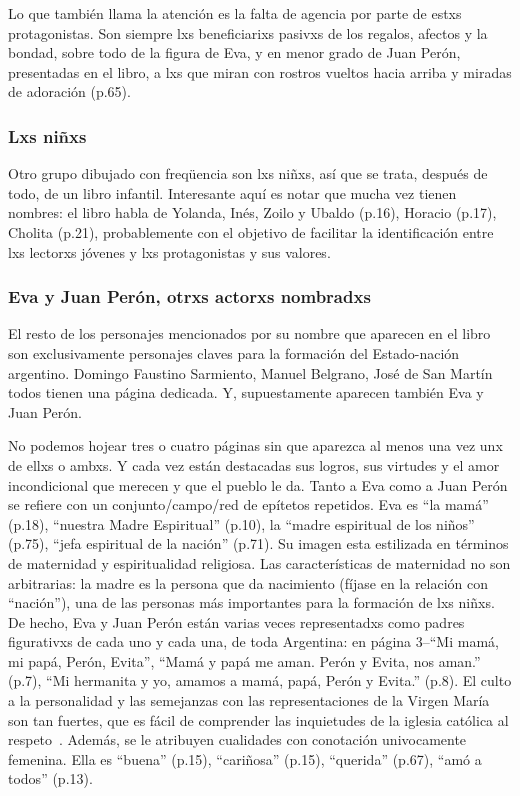 Lo que también llama la atención es la falta de agencia por parte de estxs protagonistas.
Son siempre lxs beneficiarixs pasivxs de los regalos, afectos y la bondad, sobre todo de la figura de Eva, y en menor grado de Juan Perón, presentadas en el libro, a lxs que miran con rostros vueltos hacia arriba y miradas de adoración (p.65).

\subsubsection{Lxs niñxs}
Otro grupo dibujado con freqüencia son lxs niñxs, así que se trata, después de todo, de un libro infantil.
Interesante aquí es notar que mucha vez tienen nombres: el libro habla de Yolanda, Inés, Zoilo y Ubaldo (p.16), Horacio (p.17), Cholita (p.21),
probablemente con el objetivo de facilitar la identificación entre lxs lectorxs jóvenes y lxs protagonistas y sus valores.


\subsubsection{Eva y Juan Perón, otrxs actorxs nombradxs}
El resto de los personajes mencionados por su nombre que aparecen en el libro son exclusivamente personajes claves para la formación del Estado-nación argentino.
Domingo Faustino Sarmiento, Manuel Belgrano, José de San Martín todos tienen una página dedicada.
Y, supuestamente aparecen también Eva y Juan Perón.

No podemos hojear tres o cuatro páginas sin que aparezca al menos una vez unx de ellxs o ambxs.
Y cada vez están destacadas sus logros, sus virtudes y el amor incondicional que merecen y que el pueblo le da.
Tanto a Eva como a Juan Perón se refiere con un conjunto/campo/red de epítetos repetidos.
Eva es ``la mamá'' (p.18), ``nuestra Madre Espiritual'' (p.10), la ``madre espiritual de los niños'' (p.75), ``jefa espiritual de la nación'' (p.71).
Su imagen esta estilizada en términos de maternidad y espiritualidad religiosa.
Las características de maternidad no son arbitrarias: la madre es la persona que da nacimiento (fíjase en la relación con ``nación''), una de las personas más importantes para la formación de lxs niñxs.
De hecho, Eva y Juan Perón están varias veces representadxs como padres figurativxs de cada uno y cada una, de toda Argentina:
en página 3--``Mi mamá, mi papá, Perón, Evita'', ``Mamá y papá me aman. Perón y Evita, nos aman.'' (p.7), ``Mi hermanita y yo, amamos a mamá, papá, Perón y Evita.'' (p.8).
El culto a la personalidad y las semejanzas con las representaciones de la Virgen María son tan fuertes, que es fácil de comprender las inquietudes de la iglesia católica al respeto~\autocite{Chamosa2010}.
Además, se le atribuyen cualidades con conotación univocamente femenina.
Ella es ``buena'' (p.15), ``cariñosa'' (p.15), ``querida'' (p.67), ``amó a todos'' (p.13).

